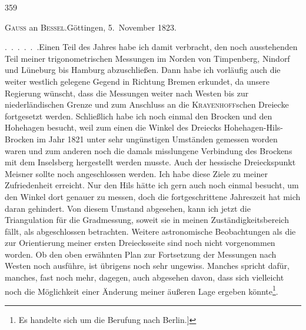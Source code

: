 \par\clearpage
{}\hfill359\par\medskip
\begin{center}
\textsc{Gauss} an \textsc{Bessel}.\quad Göttingen, 5.~November 1823.
\end{center}
\begingroup
\makeatletter
\renewcommand{\@makefnmark}{\hbox{\normalfont[\textsuperscript{*})]}}
\long\def\@makefntext#1{\parindent1.5em\noindent[\textsuperscript{*})\ #1}
\makeatother

\par\noindent\hspace*{\parindent}.\ .\ .\ .\ .\ .\quad Einen Teil des Jahres habe ich damit verbracht, den noch ausstehenden Teil meiner trigonometrischen Messungen im Norden von Timpenberg, Nindorf und Lüneburg bis Hamburg abzuschließen. Dann habe ich vorläufig auch die weiter westlich gelegene Gegend in Richtung Bremen erkundet, da unsere Regierung wünscht, dass die Messungen weiter nach Westen bis zur niederländischen Grenze und zum Anschluss an die \textsc{Krayenhoff}schen Dreiecke fortgesetzt werden. Schließlich habe ich noch einmal den Brocken und den Hohehagen besucht, weil zum einen die Winkel des Dreiecks Hohehagen-Hils-Brocken im Jahr 1821 unter sehr ungünstigen Umständen gemessen worden waren und zum anderen noch die damals misslungene Verbindung des Brockens mit dem Inselsberg hergestellt werden musste. Auch der hessische Dreieckspunkt Meisner sollte noch angeschlossen werden.
Ich habe diese Ziele  zu meiner Zufriedenheit erreicht. Nur den Hils hätte ich gern auch noch einmal besucht, um den Winkel dort genauer zu messen, doch die fortgeschrittene Jahreszeit hat mich daran gehindert.
Von diesem Umstand abgesehen, kann ich jetzt die Triangulation für die Gradmessung, soweit sie in meinen Zuständigkeitsbereich fällt, als abgeschlossen betrachten.
Weitere astronomische Beobachtungen als die zur Orientierung meiner ersten Dreiecksseite sind noch nicht vorgenommen worden.
Ob  den oben erwähnten Plan zur Fortsetzung der Messungen nach Westen noch ausführe, ist übrigens noch sehr ungewiss.
Manches spricht dafür, manches, fast noch mehr, dagegen, auch abgesehen davon, dass sich vielleicht noch die Möglichkeit einer Änderung meiner äußeren Lage ergeben könnte\footnote{Es handelte sich um die Berufung nach Berlin.]}.\par

